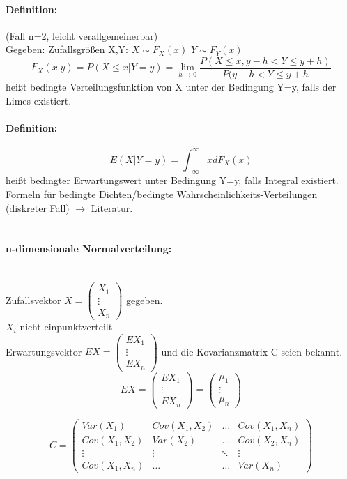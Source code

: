 \documentclass[a4paper,12pt]{scrartcl}
\begin{document}
 \paragraph{Definition:} (Fall n=2, leicht verallgemeinerbar)\\
 Gegeben: Zufallsgrößen X,Y: $X\sim F_X(x)$  $Y\sim F_Y(x)$
 $$F_X(x|y) = P(X\leq x|Y=y) = \lim_{h\rightarrow 0} \frac{P(X\leq x, y-h<Y\leq y+h)}{P(y-h<Y\leq y+h}$$
 heißt bedingte Verteilungsfunktion von X unter der Bedingung Y=y, falls der Limes existiert.\\
 \paragraph{Definition:}
 $$E(X|Y=y) = \int_{-\infty}^\infty x dF_X(x)$$
 heißt bedingter Erwartungswert unter Bedingung Y=y, falls Integral existiert.\\
 Formeln für bedingte Dichten/bedingte Wahrscheinlichkeits-Verteilungen (diskreter Fall) $\rightarrow$ Literatur.\\
 \\
 \paragraph{n-dimensionale Normalverteilung:}\quad\\
 Zufallsvektor $X= \begin{pmatrix} X_1\\ \vdots\\ X_n \end{pmatrix}$ gegeben.\\
 $X_i$ nicht einpunktverteilt\\
 Erwartungsvektor $EX = \begin{pmatrix} EX_1\\ \vdots \\ EX_n \end{pmatrix}$ und die Kovarianzmatrix C seien bekannt.\\
 $$EX = \begin{pmatrix} EX_1\\ \vdots \\ EX_n \end{pmatrix} = \begin{pmatrix}\mu_1\\ \vdots\\ \mu_n \end{pmatrix}$$
 
 $$C=
 \begin{pmatrix} 
  Var(X_1) & Cov(X_1,X_2) & \dots & Cov(X_1,X_n) \\
  Cov(X_1,X_2) & Var(X_2) & \dots & Cov(X_2,X_n) \\
  \vdots & \vdots & \ddots & \vdots \\
  Cov(X_1,X_n) & \dots & \dots & Var(X_n) 
 \end{pmatrix} $$
 
\end{document}
